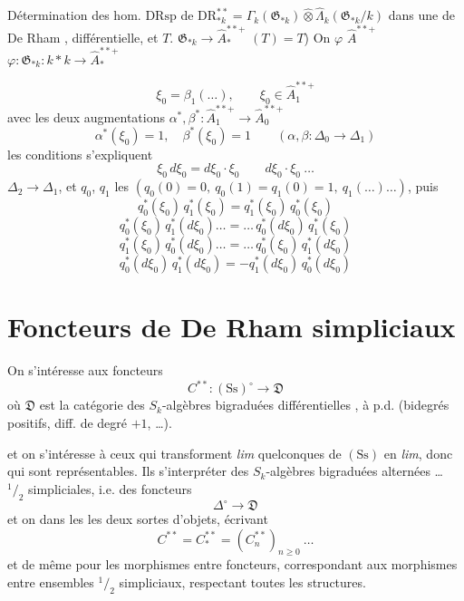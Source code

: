 \documentclass[11pt,a4paper]{article}
\begin{document}
Détermination des hom. 
$\mathrm{DRsp}$ de $\mathrm{DR}^{**}_{*k} = \Gamma_k(\mathfrak{G}_{*k}) \mathbin{\widehat{\otimes}} \widehat{\Lambda}_k(\mathfrak{G}_{*k}/k)$ dans une  de De Rham \ill{} \ill{} \ill{} , \ill{} \ill{} \ill{} différentielle, et \ill{} $T$.
\ill{} \ill{} $\mathfrak{G}_{*k} \to \widehat{A}^{**+}_{*}$ \ill{}
\ill{} \ill{} $(T) = T$)
\ill{}
On \ill{} $\varphi$ \ill{} $\widehat{A}^{**+}$ \ill{} \ill{} \ill{}
\ill{} $\varphi : \mathfrak{G}_{*k} : k \ast k \to \widehat{A}^{**+}_{*}$ \ill{} \ill{}

\[
\xi_0 = \beta_1(\ldots),
\qquad
\xi_0 \in \widehat{A}^{**+}_{1}
\]
  avec les deux augmentations
$\alpha^{*}, \beta^{*} : \widehat{A}^{**+}_{1} \to \widehat{A}^{**+}_{0}$
\[
\boxed{\alpha^{*}(\xi_0) = 1, \quad \beta^{*}(\xi_0) = 1}
\qquad (\alpha, \beta : \Delta_0 \to \Delta_1)
\]
les conditions \ill{} \ill{} s'expliquent \ill{}
\[
\boxed{\xi_0 \, d\xi_0 = d\xi_0 \cdot \xi_0}
\qquad
\boxed{d\xi_0 \cdot \xi_0 \ \ldots}
\]
\ill{} \ill{} $\Delta_2 \to \Delta_1$, et  $q_0$, $q_1$ \ill{} les \ill{}
$(q_0(0) = 0,\ q_0(1) = q_1(0) = 1,\ q_1(\ldots) \ldots)$, puis
\[
q_0^{*}(\xi_0)\, q_1^{*}(\xi_0) = q_1^{*}(\xi_0)\, q_0^{*}(\xi_0)
\]
\[
q_0^{*}(\xi_0)\, q_1^{*}(d\xi_0) \ldots = \ldots\, q_0^{*}(d\xi_0)\, q_1^{*}(\xi_0)
\]
\[
q_1^{*}(\xi_0)\, q_0^{*}(d\xi_0) \ldots = \ldots\, q_0^{*}(\xi_0)\, q_1^{*}(d\xi_0)
\]
\[
q_0^{*}(d\xi_0)\, q_1^{*}(d\xi_0) = - q_1^{*}(d\xi_0)\, q_0^{*}(d\xi_0)
\]

\section{Foncteurs de De Rham simpliciaux}

On s'intéresse aux foncteurs
\[
C^{**} : (\mathrm{Ss})^{\circ} \longrightarrow \mathfrak{D}
\]
où $\mathfrak{D}$ est la catégorie des $S_k$-algèbres bigraduées  différentielles , à p.d. (bidegrés positifs, diff. de degré $+1$, …).

et on s'intéresse à ceux qui transforment \emph{lim} quelconques de $(\mathrm{Ss})$ en \emph{lim}, donc qui sont représentables. Ils   s'interpréter   des $S_k$-algèbres bigraduées alternées … ${}^{1\!}/_{2}$ simpliciales, i.e. des foncteurs
\[
\Delta^{\circ} \longrightarrow \mathfrak{D}
\]
et on  dans les  les deux sortes d'objets, écrivant
\[
C^{**} = C^{**}_{*} = (C^{**}_{n})_{n \geqslant 0} \ \ldots
\]
et de même pour les morphismes entre foncteurs, correspondant aux morphismes entre ensembles ${}^{1\!}/_{2}$ simpliciaux, respectant toutes les structures.
\end{document}
